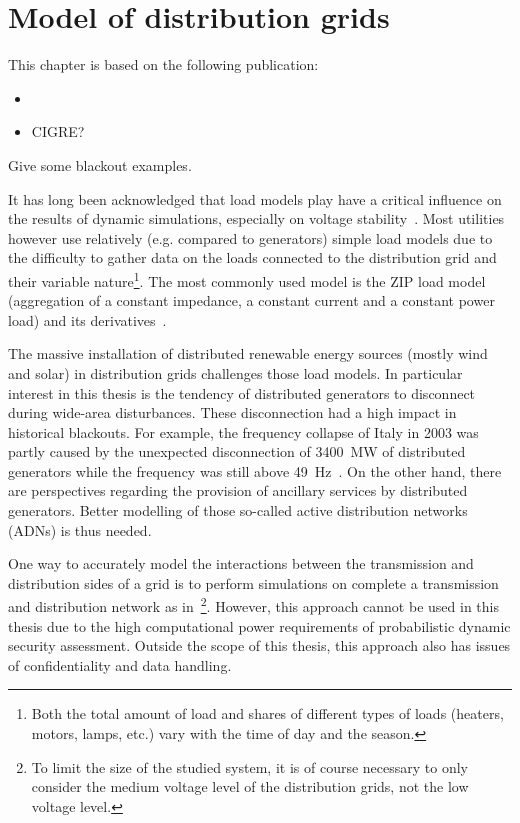 \chapter{Model of distribution grids}
\label{ch:distrib}
\minitoc

\begin{tcolorbox}[width=\linewidth, sharp corners=all,
    colback=white!80!black,
    colframe=white!80!black]
This chapter is based on the following publication:
\begin{itemize}
    \item {}
    \item CIGRE?
\end{itemize}
\end{tcolorbox}


Give some blackout examples.

It has long been acknowledged that load models play have a critical influence on the results of dynamic simulations, especially on voltage stability~\cite{kundur}. Most utilities however use relatively (e.g. compared to generators) simple load models due to the difficulty to gather data on the loads connected to the distribution grid and their variable nature\footnote{Both the total amount of load and shares of different types of loads (heaters, motors, lamps, etc.) vary with the time of day and the season.}. The most commonly used model is the ZIP load model (aggregation of a constant impedance, a constant current and a constant power load) and its derivatives~\cite{IndustryLoadModel}.

The massive installation of distributed renewable energy sources (mostly wind and solar) in distribution grids challenges those load models. In particular interest in this thesis is the tendency of distributed generators to disconnect during wide-area disturbances. These disconnection had a high impact in historical blackouts. For example, the frequency collapse of Italy in 2003 was partly caused by the unexpected disconnection of 3400~MW of distributed generators while the frequency was still above 49~Hz~\cite[p115]{Italy2003}. On the other hand, there are perspectives regarding the provision of ancillary services by distributed generators. Better modelling of those so-called active distribution networks (ADNs) is thus needed.

One way to accurately model the interactions between the transmission and distribution sides of a grid is to perform simulations on complete a transmission and distribution network as in~\cite{FullTDexample}\footnote{To limit the size of the studied system, it is of course necessary to only consider the medium voltage level of the distribution grids, not the low voltage level.}. However, this approach cannot be used in this thesis due to the high computational power requirements of probabilistic dynamic security assessment. Outside the scope of this thesis, this approach also has issues of confidentiality and data handling.


